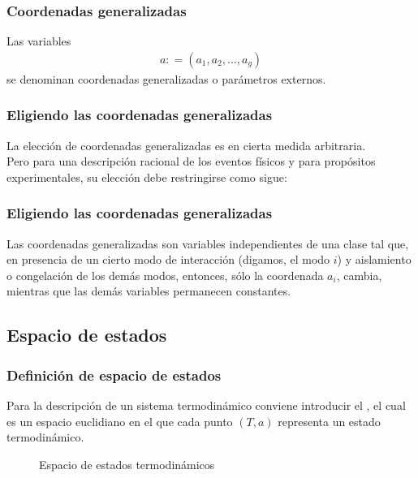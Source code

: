 \documentclass[12pt]{beamer}
\begin{document}
\begin{frame}
\frametitle{Coordenadas generalizadas}
Las variables 
\pause
\begin{align*}
a : = (a_{1}, a_{2}, \ldots, a_{g})
\end{align*}
se denominan coordenadas generalizadas o parámetros externos.
\end{frame}
\begin{frame}
\frametitle{Eligiendo las coordenadas generalizadas}
La elección de coordenadas generalizadas es en cierta medida arbitraria.
\\
\bigskip
\pause
Pero para una descripción racional de los eventos físicos y para propósitos experimentales, su elección debe restringirse como sigue:
\end{frame}
\begin{frame}
\frametitle{Eligiendo las coordenadas generalizadas}
Las coordenadas generalizadas son variables independientes de una clase tal que, en presencia de un cierto modo de interacción (digamos, el modo $i$) y aislamiento o congelación de los demás modos, entonces, sólo la coordenada $a_{i}$, cambia, mientras que las demás variables permanecen constantes.
\end{frame}

\subsection{Espacio de estados}

\begin{frame}
\frametitle{Definición de espacio de estados}
Para la descripción de un sistema termodinámico conviene introducir el , el cual es un espacio euclidiano en el que cada punto $(T, a)$ representa un estado termodinámico.
\end{frame}
\begin{frame}[plain]
\begin{figure}
\centering
    \caption{Espacio de estados termodinámicos}
\end{figure}
\end{frame}
\end{document}
